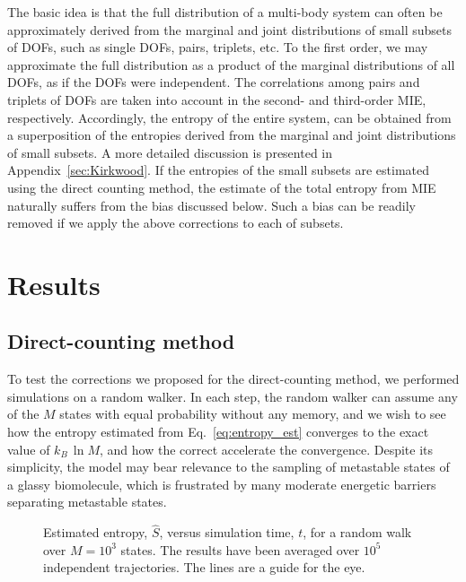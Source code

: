 \documentclass[reprint, superscriptaddress]{revtex4-1}
\begin{document}
The basic idea is that the full distribution of a multi-body system
can often be approximately derived
from the marginal and joint distributions of small subsets of DOFs,
such as single DOFs, pairs, triplets, etc.
%
To the first order,
we may approximate the full distribution as a product
of the marginal distributions of all DOFs,
as if the DOFs were independent.
%
The correlations among pairs and triplets of DOFs
are taken into account in the second- and third-order MIE,
respectively.
%
Accordingly, the entropy of the entire system,
can be obtained from a superposition of the entropies
derived from the marginal and joint distributions
of small subsets.
%
A more detailed discussion is presented in Appendix~\ref{sec:Kirkwood}.
%
If the entropies of the small subsets are estimated
using the direct counting method,
the estimate of the total entropy from MIE
naturally suffers from the bias discussed below.
%
Such a bias can be readily removed
if we apply the above corrections
to each of subsets.



\section{Results}

\subsection{Direct-counting method}

To test the corrections we proposed for the direct-counting method,
we performed simulations on a random walker.
%
In each step, the random walker can assume any of the $M$ states
with equal probability without any memory,
and we wish to see how the entropy estimated
from Eq.~\eqref{eq:entropy_est} converges to the exact value of $k_B \, \ln M$,
and how the correct accelerate the convergence.
%
Despite its simplicity, the model may bear relevance
to the sampling of metastable states of a glassy biomolecule,
which is frustrated by many moderate energetic barriers
separating metastable states.

\begin{figure}[h]\centering
  \caption{
    \label{fig:walk_q1e3}
    Estimated entropy, $\hat S$,
    versus simulation time, $t$, for a random walk over $M = 10^3$ states.
    The results have been averaged over $10^5$ independent trajectories.
    The lines are a guide for the eye.
  }
\end{figure}
\end{document}
